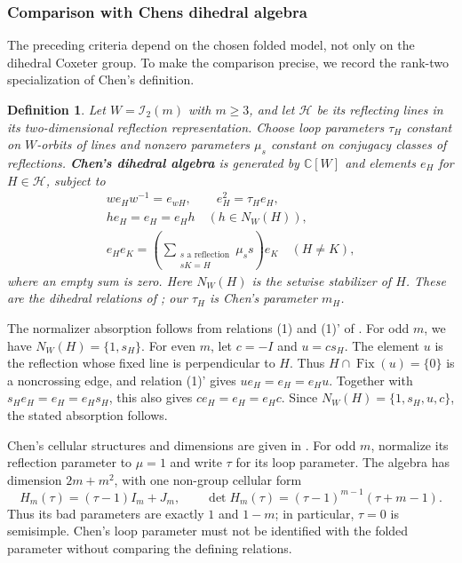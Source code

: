 \documentclass[11pt,a4paper]{amsart}
\theoremstyle{uprightdefinition}
\newtheorem{definition}[theorem]{Definition}
\theoremstyle{remark}\newtheorem{remark}[theorem]{Remark}
\begin{document}
\subsubsection*{Comparison with Chen\textquotesingle s dihedral algebra}
\label{subsec:chen-dihedral-comparison}

The preceding criteria depend on the chosen folded model, not only on
the dihedral Coxeter group. To make the comparison precise, we record
the rank-two specialization of Chen's definition.

\begin{definition}\label{def:chen-dihedral}
Let $W=\mathscr{I}_2(m)$ with $m\ge3$, and let $\mathcal H$ be its reflecting
lines in its two-dimensional reflection representation. Choose loop
parameters $\tau_H$ constant on $W$-orbits of lines and nonzero
parameters $\mu_s$ constant on conjugacy classes of reflections.
\textbf{Chen's dihedral algebra} is generated by $\mathbb C[W]$ and
elements $e_H$ for $H\in\mathcal H$, subject to
\[
\begin{gathered}
 w e_H w^{-1}=e_{wH},\qquad e_H^2=\tau_H e_H,\\
 h e_H=e_H=e_Hh\quad(h\in N_W(H)),\\
 e_He_K=\left(\sum_{\substack{s\text{ a reflection}\\sK=H}}
                  \mu_s s\right)e_K\quad(H\ne K),
\end{gathered}
\]
where an empty sum is zero. Here $N_W(H)$ is the setwise stabilizer
of $H$. These are the dihedral relations of
\cite[Definition~1.1]{Chen2012}; our $\tau_H$ is Chen's parameter $m_H$.
\end{definition}

The normalizer absorption follows from relations (1) and (1)' of
\cite[Definition~1.1]{Chen2012}. For odd $m$, we have
$N_W(H)=\{1,s_H\}$. For even $m$, let $c=-I$ and $u=cs_H$.
The element $u$ is the reflection whose fixed line is perpendicular
to $H$. Thus $H\cap\operatorname{Fix}(u)=\{0\}$ is a noncrossing
edge, and relation (1)' gives $ue_H=e_H=e_Hu$. Together with
$s_He_H=e_H=e_Hs_H$, this also gives $ce_H=e_H=e_Hc$.
Since $N_W(H)=\{1,s_H,u,c\}$, the stated absorption follows.

Chen's cellular structures and dimensions are given in
\cite[Section~6, Theorems~6.1--6.3]{Chen2012}. For odd $m$, normalize its
reflection parameter to $\mu=1$ and write $\tau$ for its loop parameter.
The algebra has dimension $2m+m^2$, with one non-group cellular form
\[
 H_m(\tau)=(\tau-1)I_m+J_m,\qquad
 \det H_m(\tau)=(\tau-1)^{m-1}(\tau+m-1).
\]
Thus its bad parameters are exactly $1$ and $1-m$; in particular,
$\tau=0$ is semisimple. Chen's loop parameter must not be identified
with the folded parameter without comparing the defining relations.
\end{document}
